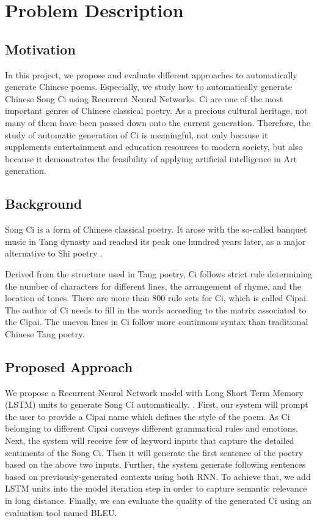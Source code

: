 \section{Problem Description}
\subsection{Motivation}  
%
In this project, we propose and evaluate different approaches to automatically generate Chinese poems. 
%
Especially, we study how to automatically generate Chinese Song Ci using Recurrent Neural Networks.
%
Ci are one of the most important genres of Chinese classical poetry. 
%
As a precious cultural heritage, not many of them have been passed down onto the current generation.
%
Therefore, the study of automatic generation of Ci is meaningful, not only because it supplements entertainment and education resources to modern society, but also because it demonstrates the feasibility of applying artificial intelligence in Art generation. 
%

\subsection{Background}
Song Ci is a form of Chinese classical poetry. It arose with the so-called banquet music in Tang dynasty and reached its peak one hundred years later, as a major alternative to Shi poetry\cite{cai2008chinesepoetry} .

Derived from the structure used in Tang poetry, Ci follows strict rule determining the number of characters for different lines, the arrangement of rhyme, and the location of tones. There are more than 800 rule sets for Ci, which is called Cipai\cite{wikici}. The author of Ci needs to fill in the words according to the matrix associated to the Cipai. The uneven lines in Ci follow more continuous syntax than traditional Chinese Tang poetry\cite{cai2008chinesepoetry}.

\subsection{Proposed Approach} 
%
We propose a Recurrent Neural Network model with Long Short Term Memory (LSTM) units to generate Song Ci automatically. .
%
First, our system will prompt the user to provide a Cipai name which defines the style of the poem.
%
As Ci belonging to different Cipai conveys different grammatical rules and emotions.
%
Next, the system will receive few of keyword inputs that capture the detailed sentiments of the Song Ci.
%
Then it will generate the first sentence of the poetry based on the above two inputs.
%
Further, the system generate following sentences based on previously-generated contexts using both RNN. 
%
To achieve that, we add LSTM units into the model iteration step in order to capture semantic relevance in long distance. 
%
Finally, we can evaluate the quality of the generated Ci using an evaluation tool named BLEU.

